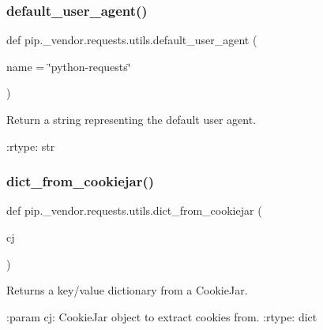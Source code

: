 \subsubsection{\texorpdfstring{default\+\_\+user\+\_\+agent()}{default\_user\_agent()}}
{\footnotesize\ttfamily def pip.\+\_\+vendor.\+requests.\+utils.\+default\+\_\+user\+\_\+agent (\begin{DoxyParamCaption}\item[{}]{name = {\ttfamily \char`\"{}python-\/requests\char`\"{}} }\end{DoxyParamCaption})}

\begin{DoxyVerb}Return a string representing the default user agent.

:rtype: str
\end{DoxyVerb}
 \mbox{\label{namespacepip_1_1__vendor_1_1requests_1_1utils_af3f34d45bda7d6efb8b5a29d114d37d2}} 
\subsubsection{\texorpdfstring{dict\+\_\+from\+\_\+cookiejar()}{dict\_from\_cookiejar()}}
{\footnotesize\ttfamily def pip.\+\_\+vendor.\+requests.\+utils.\+dict\+\_\+from\+\_\+cookiejar (\begin{DoxyParamCaption}\item[{}]{cj }\end{DoxyParamCaption})}

\begin{DoxyVerb}Returns a key/value dictionary from a CookieJar.

:param cj: CookieJar object to extract cookies from.
:rtype: dict
\end{DoxyVerb}
 \mbox{\label{namespacepip_1_1__vendor_1_1requests_1_1utils_a2d8f91bc902147ff375a5e6be69a1d2b}} 
